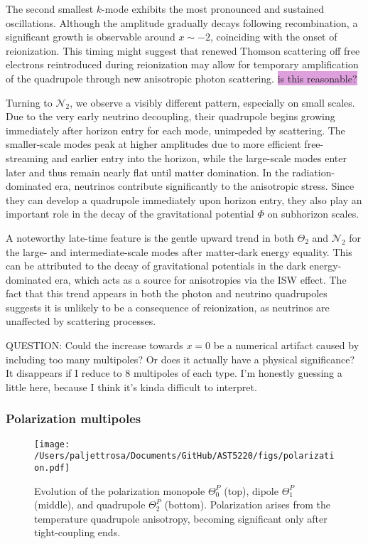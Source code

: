 \documentclass{aa}
\numberwithin{equation}{section}
\numberwithin{table}{section}
\numberwithin{figure}{section}
\begin{document}
The second smallest $k$-mode exhibits the most pronounced and sustained oscillations. Although the amplitude gradually decays following recombination, a significant growth is observable around $x \sim -2$, coinciding with the onset of reionization. This timing might suggest that renewed Thomson scattering off free electrons reintroduced during reionization may allow for temporary amplification of the quadrupole through new anisotropic photon scattering. \colorbox{Plum}{is this reasonable?}

Turning to $\mathcal{N}_2$, we observe a visibly different pattern, especially on small scales. Due to the very early neutrino decoupling, their quadrupole begins growing immediately after horizon entry for each mode, unimpeded by scattering. The smaller-scale modes peak at higher amplitudes due to more efficient free-streaming and earlier entry into the horizon, while the large-scale modes enter later and thus remain nearly flat until matter domination. In the radiation-dominated era, neutrinos contribute significantly to the anisotropic stress. Since they can develop a quadrupole immediately upon horizon entry, they also play an important role in the decay of the gravitational potential $\Phi$ on subhorizon scales.

A noteworthy late-time feature is the gentle upward trend in both $\Theta_2$ and $\mathcal{N}_2$ for the large- and intermediate-scale modes after matter-dark energy equality. This can be attributed to the decay of gravitational potentials in the dark energy-dominated era, which acts as a source for anisotropies via the ISW effect. The fact that this trend appears in both the photon and neutrino quadrupoles suggests it is unlikely to be a consequence of reionization, as neutrinos are unaffected by scattering processes.

\color{Plum}
QUESTION: Could the increase towards $x=0$ be a numerical artifact caused by including too many multipoles? Or does it actually have a physical significance? It disappears if I reduce to 8 multipoles of each type. I'm honestly guessing a little here, because I think it's kinda difficult to interpret.
\color{black}


\subsubsection{Polarization multipoles}

\begin{figure}
  \centering
  \texttt{[image: /Users/paljettrosa/Documents/GitHub/AST5220/figs/polarization.pdf]}
  \caption{Evolution of the polarization monopole $\Theta^P_0$ (top), dipole $\Theta^P_1$ (middle), and quadrupole $\Theta^P_2$ (bottom). Polarization arises from the temperature quadrupole anisotropy, becoming significant only after tight-coupling ends.}\label{fig:polarization}
\end{figure}
\end{document}
